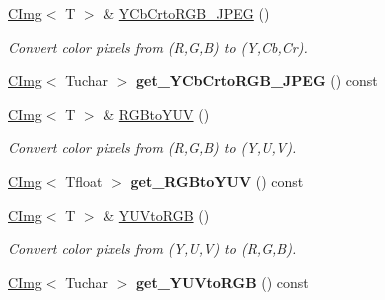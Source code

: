 \begin{DoxyCompactItemize}
\item 
\hypertarget{structcimg__library_1_1CImg_a8eb0643c23ad66ec1e8aec3099514cd9}{
\hyperlink{structcimg__library_1_1CImg}{CImg}$<$ T $>$ \& \hyperlink{structcimg__library_1_1CImg_a8eb0643c23ad66ec1e8aec3099514cd9}{YCbCrtoRGB\_\-JPEG} ()}
\label{structcimg__library_1_1CImg_a8eb0643c23ad66ec1e8aec3099514cd9}

\begin{DoxyCompactList}\small\item\em Convert color pixels from (R,G,B) to (Y,Cb,Cr). \item\end{DoxyCompactList}\item 
\hypertarget{structcimg__library_1_1CImg_a9e9c8fa9ddc31a250f551e31c37e4ffb}{
\hyperlink{structcimg__library_1_1CImg}{CImg}$<$ Tuchar $>$ {\bfseries get\_\-YCbCrtoRGB\_\-JPEG} () const }
\label{structcimg__library_1_1CImg_a9e9c8fa9ddc31a250f551e31c37e4ffb}

\item 
\hypertarget{structcimg__library_1_1CImg_ae9383bb8937b8fa8e96f9612305c55bd}{
\hyperlink{structcimg__library_1_1CImg}{CImg}$<$ T $>$ \& \hyperlink{structcimg__library_1_1CImg_ae9383bb8937b8fa8e96f9612305c55bd}{RGBtoYUV} ()}
\label{structcimg__library_1_1CImg_ae9383bb8937b8fa8e96f9612305c55bd}

\begin{DoxyCompactList}\small\item\em Convert color pixels from (R,G,B) to (Y,U,V). \item\end{DoxyCompactList}\item 
\hypertarget{structcimg__library_1_1CImg_a9c4fac27c39194ecf7fa5fe4ed6267b4}{
\hyperlink{structcimg__library_1_1CImg}{CImg}$<$ Tfloat $>$ {\bfseries get\_\-RGBtoYUV} () const }
\label{structcimg__library_1_1CImg_a9c4fac27c39194ecf7fa5fe4ed6267b4}

\item 
\hypertarget{structcimg__library_1_1CImg_a45958abd08f2a93d33fb77de4e5b0a66}{
\hyperlink{structcimg__library_1_1CImg}{CImg}$<$ T $>$ \& \hyperlink{structcimg__library_1_1CImg_a45958abd08f2a93d33fb77de4e5b0a66}{YUVtoRGB} ()}
\label{structcimg__library_1_1CImg_a45958abd08f2a93d33fb77de4e5b0a66}

\begin{DoxyCompactList}\small\item\em Convert color pixels from (Y,U,V) to (R,G,B). \item\end{DoxyCompactList}\item 
\hypertarget{structcimg__library_1_1CImg_a1982bc581b64ea9e3e583e2ec77b2e8b}{
\hyperlink{structcimg__library_1_1CImg}{CImg}$<$ Tuchar $>$ {\bfseries get\_\-YUVtoRGB} () const }
\label{structcimg__library_1_1CImg_a1982bc581b64ea9e3e583e2ec77b2e8b}


\end{DoxyCompactItemize}
